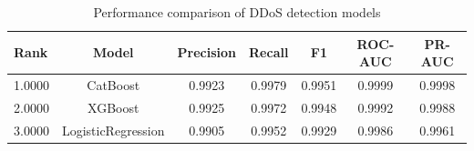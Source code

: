 \begin{table}
\caption{Performance comparison of DDoS detection models}
\label{tab:model_comparison}
\begin{tabular}{lcccccc}
\midrule
Rank & Model & Precision & Recall & F1 & ROC-AUC & PR-AUC \\
\midrule
1.0000 & CatBoost & 0.9923 & 0.9979 & 0.9951 & 0.9999 & 0.9998 \\
2.0000 & XGBoost & 0.9925 & 0.9972 & 0.9948 & 0.9992 & 0.9988 \\
3.0000 & LogisticRegression & 0.9905 & 0.9952 & 0.9929 & 0.9986 & 0.9961 \\
\bottomrule
\end{tabular}
\end{table}
